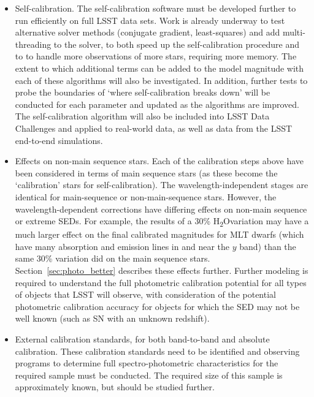 \documentclass[12pt,preprint]{aastex}
\newcommand{\water}   {H\textsubscript{2}O}
\begin{document}
\begin{itemize}
\item{Self-calibration. The self-calibration software must be
    developed further to run efficiently on full LSST data sets. Work
    is already underway to test alternative solver methods (conjugate
    gradient, least-squares) and add multi-threading to the
    solver, to both speed up the self-calibration procedure and to
    to handle more observations of more stars, requiring more
    memory. The extent to which additional terms can be added to the
    model magnitude with each of these algorithms will also be
    investigated. In addition, further tests to probe the boundaries
    of `where self-calibration breaks down' will be conducted for each
    parameter and updated as the algorithms are improved. The
    self-calibration algorithm will also be included into LSST Data
    Challenges and applied to real-world data, as well as data from
    the LSST end-to-end simulations.}

\item{Effects on non-main sequence stars. Each of the calibration
    steps above have been considered in terms of main sequence
    stars (as these become the `calibration' stars for
    self-calibration).  The wavelength-independent stages are
    identical for main-sequence or non-main-sequence stars. However,
    the wavelength-dependent corrections have differing effects on
    non-main sequence or extreme SEDs. For example, the results of a
    30\% \water variation may have a much larger effect on the final
    calibrated magnitudes for MLT dwarfs (which have many absorption
    and emission lines in and near the $y$ band) than the same 30\%
    variation did on the main sequence
    stars. Section~\ref{sec:photo_better} describes these effects
    further. Further modeling is required to understand the full
    photometric calibration potential for all types of objects that
    LSST will observe, with consideration of the potential photometric
    calibration accuracy for objects for which the SED may not be well
    known (such as SN with an unknown redshift). }
  
\item{External calibration standards, for both band-to-band and
    absolute calibration. These calibration standards need to be
    identified and observing programs to determine full
    spectro-photometric characteristics for the required sample must
    be conducted. The required size of this sample is approximately
    known, but should be studied further. }

\end{itemize}
\end{document}
